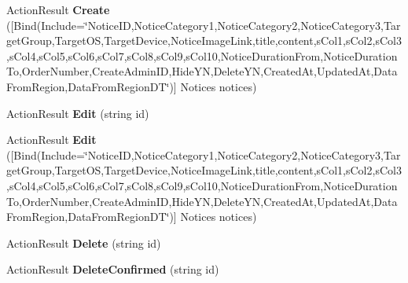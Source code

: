 \begin{DoxyCompactItemize}
\item 
Action\+Result {\bfseries Create} (\mbox{[}Bind(Include=\char`\"{}Notice\+ID,Notice\+Category1,Notice\+Category2,Notice\+Category3,Target\+Group,Target\+OS,Target\+Device,Notice\+Image\+Link,title,content,s\+Col1,s\+Col2,s\+Col3,s\+Col4,s\+Col5,s\+Col6,s\+Col7,s\+Col8,s\+Col9,s\+Col10,Notice\+Duration\+From,Notice\+Duration\+To,Order\+Number,Create\+Admin\+ID,Hide\+YN,Delete\+YN,Created\+At,Updated\+At,Data\+From\+Region,Data\+From\+Region\+DT\char`\"{})\mbox{]} Notices notices)\hypertarget{class_cloud_bread_admin_web_1_1_controllers_1_1_notices_controller_a8da7620948c17876ea9b3f4950621878}{}\label{class_cloud_bread_admin_web_1_1_controllers_1_1_notices_controller_a8da7620948c17876ea9b3f4950621878}

\item 
Action\+Result {\bfseries Edit} (string id)\hypertarget{class_cloud_bread_admin_web_1_1_controllers_1_1_notices_controller_afa610ec3d13c73a22942a64fa9a51401}{}\label{class_cloud_bread_admin_web_1_1_controllers_1_1_notices_controller_afa610ec3d13c73a22942a64fa9a51401}

\item 
Action\+Result {\bfseries Edit} (\mbox{[}Bind(Include=\char`\"{}Notice\+ID,Notice\+Category1,Notice\+Category2,Notice\+Category3,Target\+Group,Target\+OS,Target\+Device,Notice\+Image\+Link,title,content,s\+Col1,s\+Col2,s\+Col3,s\+Col4,s\+Col5,s\+Col6,s\+Col7,s\+Col8,s\+Col9,s\+Col10,Notice\+Duration\+From,Notice\+Duration\+To,Order\+Number,Create\+Admin\+ID,Hide\+YN,Delete\+YN,Created\+At,Updated\+At,Data\+From\+Region,Data\+From\+Region\+DT\char`\"{})\mbox{]} Notices notices)\hypertarget{class_cloud_bread_admin_web_1_1_controllers_1_1_notices_controller_ac2fb1f3b946ebacc7cdd78a293a6460f}{}\label{class_cloud_bread_admin_web_1_1_controllers_1_1_notices_controller_ac2fb1f3b946ebacc7cdd78a293a6460f}

\item 
Action\+Result {\bfseries Delete} (string id)\hypertarget{class_cloud_bread_admin_web_1_1_controllers_1_1_notices_controller_a3c38863679e9124ae1b9e91610ea79a9}{}\label{class_cloud_bread_admin_web_1_1_controllers_1_1_notices_controller_a3c38863679e9124ae1b9e91610ea79a9}

\item 
Action\+Result {\bfseries Delete\+Confirmed} (string id)\hypertarget{class_cloud_bread_admin_web_1_1_controllers_1_1_notices_controller_a7f9730eda286bfc73da208684c1128d0}{}\label{class_cloud_bread_admin_web_1_1_controllers_1_1_notices_controller_a7f9730eda286bfc73da208684c1128d0}

\end{DoxyCompactItemize}
